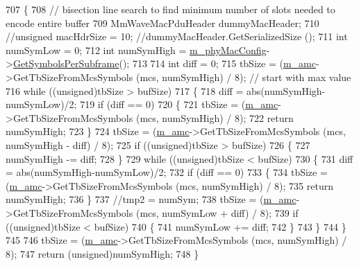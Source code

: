 \begin{DoxyCode}
707 \{
708         \textcolor{comment}{// bisection line search to find minimum number of slots needed to encode entire buffer}
709         MmWaveMacPduHeader dummyMacHeader;
710         \textcolor{comment}{//unsigned macHdrSize = 10; //dummyMacHeader.GetSerializedSize ();}
711         \textcolor{keywordtype}{int} numSymLow = 0;
712         \textcolor{keywordtype}{int} numSymHigh = \hyperlink{classns3_1_1MmWaveMacScheduler_a24d7af4971d2e500fe543cefbafa2fd9}{m\_phyMacConfig}->\hyperlink{classns3_1_1MmWavePhyMacCommon_a2fe835b76e3c689defa413e395cd10cb}{GetSymbolsPerSubframe}();
713 
714         \textcolor{keywordtype}{int} diff = 0;
715         tbSize = (\hyperlink{classns3_1_1MmWaveFlexTtiMaxWeightMacScheduler_a36c22ad89fe5d6743a058f253a43a70d}{m\_amc}->GetTbSizeFromMcsSymbols (mcs, numSymHigh) / 8); \textcolor{comment}{// start with max value}
716         \textcolor{keywordflow}{while} ((\textcolor{keywordtype}{unsigned})tbSize > bufSize)
717         \{
718                 diff = abs(numSymHigh-numSymLow)/2;
719                 \textcolor{keywordflow}{if} (diff == 0)
720                 \{
721                         tbSize = (\hyperlink{classns3_1_1MmWaveFlexTtiMaxWeightMacScheduler_a36c22ad89fe5d6743a058f253a43a70d}{m\_amc}->GetTbSizeFromMcsSymbols (mcs, numSymHigh) / 8);
722                         \textcolor{keywordflow}{return} numSymHigh;
723                 \}
724                 tbSize = (\hyperlink{classns3_1_1MmWaveFlexTtiMaxWeightMacScheduler_a36c22ad89fe5d6743a058f253a43a70d}{m\_amc}->GetTbSizeFromMcsSymbols (mcs, numSymHigh - diff) / 8);
725                 \textcolor{keywordflow}{if} ((\textcolor{keywordtype}{unsigned})tbSize > bufSize)
726                 \{
727                         numSymHigh -= diff;
728                 \}
729                 \textcolor{keywordflow}{while} ((\textcolor{keywordtype}{unsigned})tbSize < bufSize)
730                 \{
731                         diff = abs(numSymHigh-numSymLow)/2;
732                         \textcolor{keywordflow}{if} (diff == 0)
733                         \{
734                                 tbSize = (\hyperlink{classns3_1_1MmWaveFlexTtiMaxWeightMacScheduler_a36c22ad89fe5d6743a058f253a43a70d}{m\_amc}->GetTbSizeFromMcsSymbols (mcs, numSymHigh) / 8);
735                                 \textcolor{keywordflow}{return} numSymHigh;
736                         \}
737                         \textcolor{comment}{//tmp2 = numSym;}
738                         tbSize = (\hyperlink{classns3_1_1MmWaveFlexTtiMaxWeightMacScheduler_a36c22ad89fe5d6743a058f253a43a70d}{m\_amc}->GetTbSizeFromMcsSymbols (mcs, numSymLow + diff) / 8);
739                         \textcolor{keywordflow}{if} ((\textcolor{keywordtype}{unsigned})tbSize < bufSize)
740                         \{
741                                 numSymLow += diff;
742                         \}
743                 \}
744         \}
745 
746         tbSize = (\hyperlink{classns3_1_1MmWaveFlexTtiMaxWeightMacScheduler_a36c22ad89fe5d6743a058f253a43a70d}{m\_amc}->GetTbSizeFromMcsSymbols (mcs, numSymHigh) / 8);
747         \textcolor{keywordflow}{return} (\textcolor{keywordtype}{unsigned})numSymHigh;
748 \}
\end{DoxyCode}


